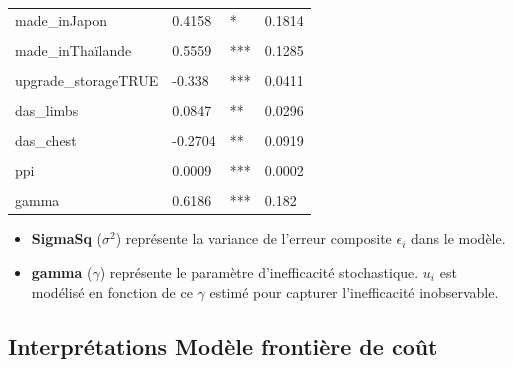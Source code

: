 \documentclass[
  12pt,
]{report}
\begin{document}
\begin{table}[!h]
\begin{tabular}[t]{llll}
made\_inJapon & 0.4158 & * & 0.1814\\
\addlinespace
\cellcolor{gray!10}{made\_inTaïwan} & \cellcolor{gray!10}{0.5101} & \cellcolor{gray!10}{*} & \cellcolor{gray!10}{0.2233}\\
made\_inThaïlande & 0.5559 & *** & 0.1285\\
\cellcolor{gray!10}{made\_inViêt Nam} & \cellcolor{gray!10}{-0.1071} & \cellcolor{gray!10}{} & \cellcolor{gray!10}{0.0576}\\
upgrade\_storageTRUE & -0.338 & *** & 0.0411\\
\cellcolor{gray!10}{das\_head} & \cellcolor{gray!10}{-0.2046} & \cellcolor{gray!10}{***} & \cellcolor{gray!10}{0.0587}\\
\addlinespace
das\_limbs & 0.0847 & ** & 0.0296\\
\cellcolor{gray!10}{fast\_chargingTRUE} & \cellcolor{gray!10}{-0.1595} & \cellcolor{gray!10}{**} & \cellcolor{gray!10}{0.057}\\
das\_chest & -0.2704 & ** & 0.0919\\
\cellcolor{gray!10}{network5G} & \cellcolor{gray!10}{0.305} & \cellcolor{gray!10}{***} & \cellcolor{gray!10}{0.0353}\\
ppi & 0.0009 & *** & 0.0002\\
\addlinespace
\cellcolor{gray!10}{sigmaSq} & \cellcolor{gray!10}{0.0762} & \cellcolor{gray!10}{***} & \cellcolor{gray!10}{0.0162}\\
gamma & 0.6186 & *** & 0.182\\
\bottomrule
\end{tabular}
\end{table}

\begin{itemize}
\item
  \textbf{SigmaSq} (\(\sigma^2\)) représente la variance de l'erreur
  composite \(\epsilon_i\) dans le modèle.
\item
  \textbf{gamma} (\(\gamma\)) représente le paramètre d'inefficacité
  stochastique. \(u_i\)\hspace{0pt} est modélisé en fonction de ce
  \(\gamma\) estimé pour capturer l'inefficacité inobservable.
\end{itemize}

\newpage

\subsection{Interprétations Modèle frontière de
coût}\label{interpruxe9tations-moduxe8le-frontiuxe8re-de-couxfbt}
\end{document}
